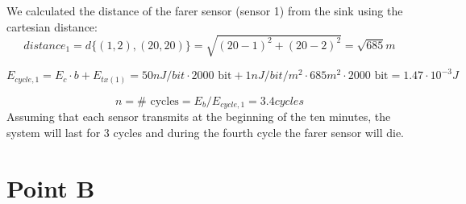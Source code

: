 We calculated the distance of the farer sensor (sensor 1) from the sink using the cartesian distance: \[ distance_1 = d \{(1, 2) , (20, 20)\} = \sqrt{(20-1)^2 + (20-2)^2} = \sqrt{685} m \]

\[
E_{cycle, 1} = E_c \cdot b + E_{tx(1)} = 50 nJ/bit \cdot 2000 \text{ bit} + 1 nJ/bit/m^2 \cdot 685 m^2 \cdot 2000 \text{ bit} = 1.47 \cdot 10^{-3} J
\]

\[
n = \text{# cycles} = E_b / E_{cycle, 1} = 3.4 cycles
\]
Assuming that each sensor transmits at the beginning of the ten minutes, the system will last for 3 cycles and during the fourth cycle the farer sensor will die.

\section{Point B}









